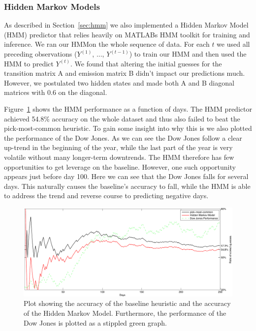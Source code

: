 \documentclass[10pt, twocolumn]{article}
\begin{document}
\subsubsection{Hidden Markov Models}
\label{hmm-eval}

As described in Section~\ref{sec:hmm} we also implemented a Hidden Markov Model (HMM) predictor that relies heavily on MATLABs HMM toolkit for training and inference.
We ran our HMMon the whole sequence of data. For each $t$ we used all preceding observations ($Y^{(1)}$, ..., $Y^{(t-1)}$) to train our HMM and then used the HMM to predict $Y^{(t)}$.
We found that altering the initial guesses for the transition matrix A and emission matrix B didn't impact our predictions much.
However, we postulated two hidden states and made both A and B diagonal matrices with 0.6 on the diagonal.

Figure~\ref{fig:hmm-experiment} shows the HMM performance as a function of days.
The HMM predictor achieved 54.8\% accuracy on the whole dataset and thus also failed to beat the pick-most-common heuristic.
To gain some insight into why this is we also plotted the performance of the Dow Jones.
As we can see the Dow Jones follow a clear up-trend in the beginning of the year, while the last part of the year is very volatile without many longer-term downtrends.
The HMM therefore has few opportunities to get leverage on the baseline.
However, one such opportunity appears just before day 100. Here we can see that the Dow Jones falls for several days. This naturally causes the baseline's accuracy to fall, while the HMM is able to address the trend and reverse course to predicting negative days.


\begin{figure}
\center
\hspace{0.5cm}
\includegraphics[width=16cm]{experiments/hmm_experiment.pdf}
\caption{Plot showing the accuracy of the baseline heuristic and the accuracy of the Hidden Markov Model. Furthermore, the performance of the Dow Jones is plotted as a stippled green graph.}
\label{fig:hmm-experiment}
\end{figure}
\end{document}

